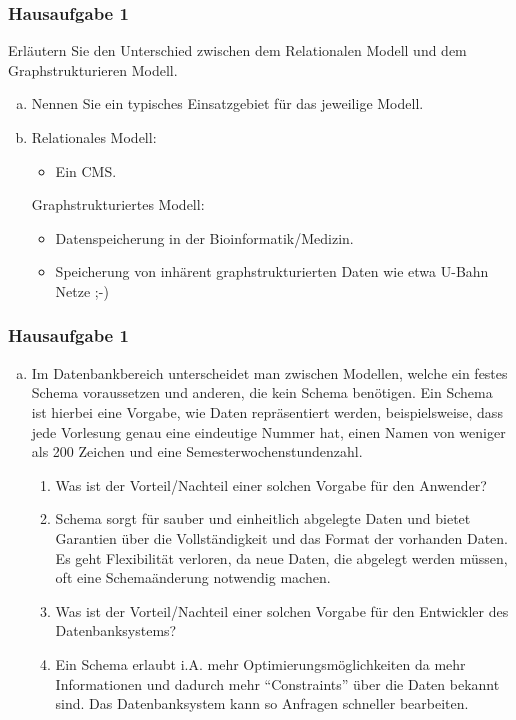 \begin{frame}
	\frametitle{Hausaufgabe 1}
	\vspace{0.5cm}

	Erläutern Sie den Unterschied zwischen dem Relationalen Modell und dem Graphstrukturieren Modell.
	\begin{enumerate}[(a)]
		\item<1-> Nennen Sie ein typisches Einsatzgebiet für das jeweilige Modell.
		\item<2->[]
		      Relationales Modell:
		      \begin{itemize}
			      \item Ein CMS.
		      \end{itemize}
		      Graphstrukturiertes Modell:
		      \begin{itemize}
			      \item Datenspeicherung in der Bioinformatik/Medizin.
			      \item Speicherung von inhärent graphstrukturierten Daten wie etwa U-Bahn Netze ;-)
		      \end{itemize}
	\end{enumerate}
\end{frame}

\begin{frame}
	\frametitle{Hausaufgabe 1}
	\vspace{0.5cm}

	\begin{enumerate}[(b)]
		\item<1-> Im Datenbankbereich unterscheidet man zwischen Modellen,
		      welche ein festes Schema voraussetzen und anderen,
		      die kein Schema benötigen. Ein Schema ist hierbei eine Vorgabe,
		      wie Daten repräsentiert werden, beispielsweise, dass jede Vorlesung genau
		      eine eindeutige Nummer hat, einen Namen von weniger als 200 Zeichen und eine
		      Semesterwochenstundenzahl.
		      \begin{enumerate}[1)]
			      \item<1-> Was ist der Vorteil/Nachteil einer solchen Vorgabe für den Anwender?
			      \item<2->[] Schema sorgt für sauber und einheitlich abgelegte Daten
			            und bietet Garantien über die Vollständigkeit und das Format der vorhanden Daten.
			            Es geht Flexibilität verloren, da neue Daten, die abgelegt werden müssen,
			            oft eine Schemaänderung notwendig machen.
			      \item<1-> Was ist der Vorteil/Nachteil einer solchen Vorgabe für den Entwickler des
			            Datenbanksystems?
			      \item<2->[] Ein Schema erlaubt i.A. mehr Optimierungsmöglichkeiten da mehr Informationen
			            und dadurch mehr “Constraints” über die Daten bekannt sind.
			            Das Datenbanksystem kann so Anfragen schneller bearbeiten.
		      \end{enumerate}
	\end{enumerate}
\end{frame}

